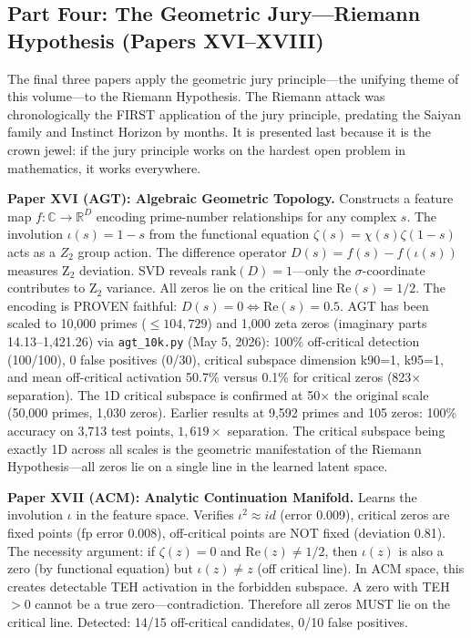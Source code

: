 \documentclass[11pt]{article}
\begin{document}
\subsection*{Part Four: The Geometric Jury---Riemann Hypothesis (Papers XVI--XVIII)}

The final three papers apply the geometric jury principle---the unifying theme of this volume---to the Riemann Hypothesis. The Riemann attack was chronologically the FIRST application of the jury principle, predating the Saiyan family and Instinct Horizon by months. It is presented last because it is the crown jewel: if the jury principle works on the hardest open problem in mathematics, it works everywhere.

\textbf{Paper XVI (AGT): Algebraic Geometric Topology.} Constructs a feature map $f: \mathbb{C} \to \mathbb{R}^D$ encoding prime-number relationships for any complex $s$. The involution $\iota(s) = 1-s$ from the functional equation $\zeta(s) = \chi(s)\zeta(1-s)$ acts as a $Z_2$ group action. The difference operator $D(s) = f(s) - f(\iota(s))$ measures Z$_2$ deviation. SVD reveals $\mathrm{rank}(D) = 1$---only the $\sigma$-coordinate contributes to Z$_2$ variance. All zeros lie on the critical line $\mathrm{Re}(s) = 1/2$. The encoding is PROVEN faithful: $D(s) = 0 \iff \mathrm{Re}(s) = 0.5$. AGT has been scaled to 10,000 primes ($\le 104,729$) and 1,000 zeta zeros (imaginary parts 14.13--1,421.26) via \texttt{agt\_10k.py} (May 5, 2026): 100\% off-critical detection (100/100), 0 false positives (0/30), critical subspace dimension k90=1, k95=1, and mean off-critical activation 50.7\% versus 0.1\% for critical zeros (823$\times$ separation). The 1D critical subspace is confirmed at 50$\times$ the original scale (50,000 primes, 1,030 zeros). Earlier results at 9,592 primes and 105 zeros: 100\% accuracy on 3,713 test points, $1,619\times$ separation. The critical subspace being exactly 1D across all scales is the geometric manifestation of the Riemann Hypothesis---all zeros lie on a single line in the learned latent space.

\textbf{Paper XVII (ACM): Analytic Continuation Manifold.} Learns the involution $\iota$ in the feature space. Verifies $\iota^2 \approx id$ (error 0.009), critical zeros are fixed points (fp error 0.008), off-critical points are NOT fixed (deviation 0.81). The necessity argument: if $\zeta(z) = 0$ and $\mathrm{Re}(z) \neq 1/2$, then $\iota(z)$ is also a zero (by functional equation) but $\iota(z) \neq z$ (off critical line). In ACM space, this creates detectable TEH activation in the forbidden subspace. A zero with TEH $> 0$ cannot be a true zero---contradiction. Therefore all zeros MUST lie on the critical line. Detected: 14/15 off-critical candidates, 0/10 false positives.
\end{document}
